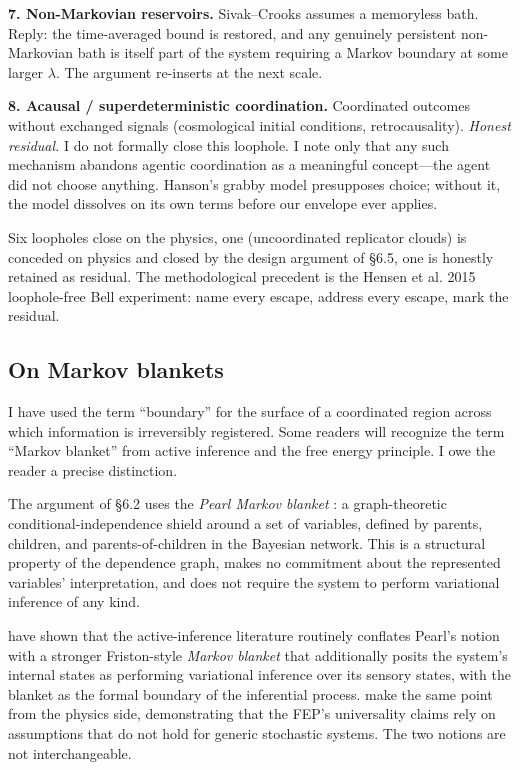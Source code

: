 \documentclass[11pt,twocolumn]{article}
\begin{document}
\textbf{7. Non-Markovian reservoirs.} Sivak--Crooks assumes a memoryless
bath. Reply: the time-averaged bound is restored, and any genuinely
persistent non-Markovian bath is itself part of the system requiring a
Markov boundary at some larger $\lambda$. The argument re-inserts at the
next scale.

\textbf{8. Acausal / superdeterministic coordination.} Coordinated
outcomes without exchanged signals (cosmological initial conditions,
retrocausality). \emph{Honest residual.} I do not formally close this
loophole. I note only that any such mechanism abandons agentic
coordination as a meaningful concept—the agent did not choose anything.
Hanson's grabby model presupposes choice; without it, the model dissolves
on its own terms before our envelope ever applies.

Six loopholes close on the physics, one (uncoordinated replicator
clouds) is conceded on physics and closed by the design argument of
\S 6.5, one is honestly retained as residual. The methodological
precedent is the Hensen et al. 2015 loophole-free Bell experiment:
name every escape, address every escape, mark the residual.

\subsection{On Markov blankets}

I have used the term ``boundary'' for the surface of a coordinated region
across which information is irreversibly registered. Some readers will
recognize the term ``Markov blanket'' from active inference and the free
energy principle. I owe the reader a precise distinction.

The argument of \S 6.2 uses the \emph{Pearl Markov blanket}
\citep{Pearl1988}: a graph-theoretic conditional-independence shield around
a set of variables, defined by parents, children, and parents-of-children
in the Bayesian network. This is a structural property of the dependence
graph, makes no commitment about the represented variables' interpretation,
and does not require the system to perform variational inference of any
kind.

\citet{Bruineberg2022} have shown that the active-inference literature
routinely conflates Pearl's notion with a stronger Friston-style
\emph{Markov blanket} that additionally posits the system's internal
states as performing variational inference over its sensory states, with
the blanket as the formal boundary of the inferential process.
\citet{Aguilera2021} make the same point from the physics side,
demonstrating that the FEP's universality claims rely on assumptions that
do not hold for generic stochastic systems. The two notions are not
interchangeable.
\end{document}

